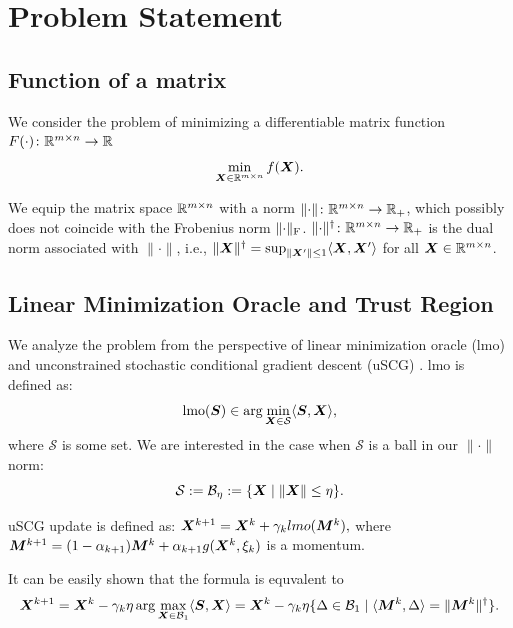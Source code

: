\documentclass{article} %
\newcommand{\norm}[1]{\lVert #1\rVert}
\newcommand{\Rmn}{\R^{m\times n}}
\newcommand{\cB}{\mathcal{B}}
\newcommand{\cS}{\mathcal{S}}
\DeclarePairedDelimiter{\normf}{\|}{\|_\mathrm{F}}
\def\<#1,#2>{\langle #1,#2\rangle}
\begin{document}
\section{Problem Statement}
\subsection{Function of a matrix}
    We consider the problem of minimizing a differentiable matrix function $F(\cdot)\colon \Rmn \to \R$
    \begin{equation}\label{eq:mat}
        \min_{\mX \in \Rmn} f(\mX).
    \end{equation}

    We equip the matrix space $\Rmn$ with a norm $\norm{\cdot}\colon \Rmn \to \R_+$, which possibly does not coincide with the Frobenius norm $\normf{\cdot}$. $\norm{\cdot}^\dagger\colon \Rmn \to \R_+$ is the dual norm associated with $\norm{\cdot}$, i.e., $\norm{\mX}^\dagger = \sup_{\norm{\mX'}\leq 1} \<\mX,\mX'>$ for all $\mX \in \Rmn$.
 
\subsection{Linear Minimization Oracle and Trust Region}
    We analyze the problem from the perspective of linear minimization oracle (lmo) and unconstrained stochastic conditional gradient descent (uSCG) \citep{pethick2025training}. lmo is defined as:
    \begin{equation}\label{eq:lmo}
        \mathrm{lmo}(\mS) \in \arg\min_{\mX \in \cS} \<\mS, \mX>,
    \end{equation}
    where $\cS$ is some set. We are interested in the case when $\cS$ is a ball in our $\norm{\cdot}$ norm:
    \begin{equation}\label{eq:ball}
        \cS := \cB_\eta :=\{ \mX \mid \norm{\mX} \leq \eta \}.
    \end{equation}

    uSCG update is defined as:
    ${\bm{X}}^{k+1} = {\bm{X}}^{k} + \gamma_k lmo({\bm{M}}^k),$ where ${\bm{M}}^{k+1} = (1-\alpha_{k+1}){\bm{M}}^{k} + \alpha_{k+1}g({\bm{X}}^k, \xi_k)$ is a momentum.

    It can be easily shown that the formula is equvalent to
    \begin{equation}\label{eq:almost_trust_update}
        \mX^{k+1} = \mX^{k} - \gamma_k\eta \arg\max_{\mX \in \cB_1} \<\mS, \mX> = \mX^{k} - \gamma_k\eta \{\Delta \in \cB_1 \mid \<\mM^k, \Delta> = \norm{\mM^k}^\dagger\}.
    \end{equation}
\end{document}
